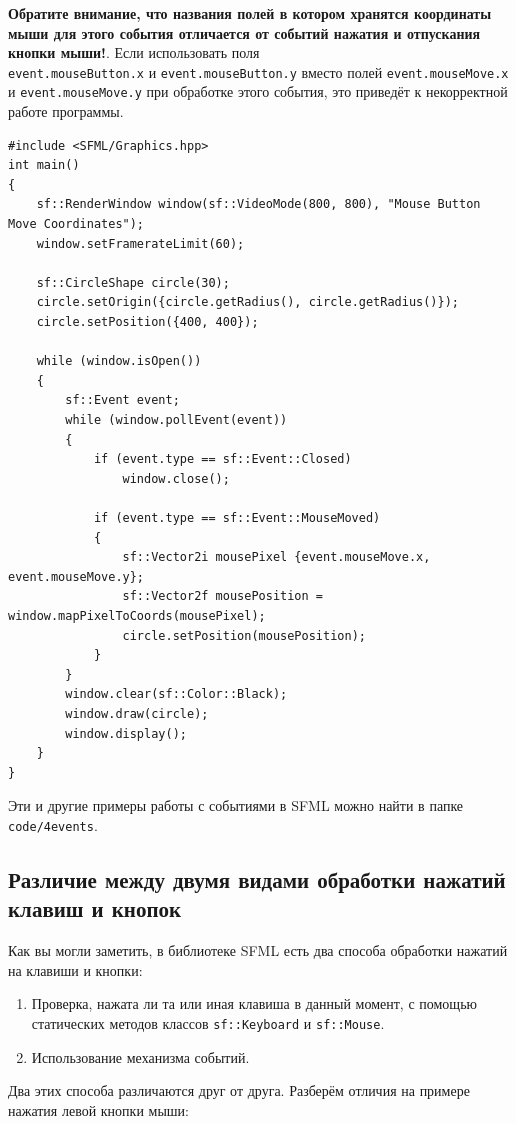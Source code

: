 \documentclass{article}
\begin{document}
\textbf{Обратите внимание, что названия полей в котором хранятся координаты мыши для этого события отличается от событий нажатия и отпускания кнопки мыши!}. Если использовать поля\\ \texttt{event.mouseButton.x} и \texttt{event.mouseButton.у} вместо полей \texttt{event.mouseMove.x} и \texttt{event.mouseMove.у} при обработке этого события, это приведёт к некорректной работе программы.
\begin{lstlisting}
#include <SFML/Graphics.hpp>
int main()
{
    sf::RenderWindow window(sf::VideoMode(800, 800), "Mouse Button Move Coordinates");
    window.setFramerateLimit(60);

    sf::CircleShape circle(30);
    circle.setOrigin({circle.getRadius(), circle.getRadius()});
    circle.setPosition({400, 400});

    while (window.isOpen()) 
    {
        sf::Event event;
        while (window.pollEvent(event)) 
        {
            if (event.type == sf::Event::Closed)
                window.close();

            if (event.type == sf::Event::MouseMoved)
            {
                sf::Vector2i mousePixel {event.mouseMove.x, event.mouseMove.y};
                sf::Vector2f mousePosition = window.mapPixelToCoords(mousePixel);
                circle.setPosition(mousePosition);
            }
        }
        window.clear(sf::Color::Black);
        window.draw(circle);
        window.display();
    }
}
\end{lstlisting}

Эти и другие примеры работы с событиями в SFML можно найти в папке \texttt{code/4events}.


\newpage
\subsection*{Различие между двумя видами обработки нажатий клавиш и кнопок}
Как вы могли заметить, в библиотеке SFML есть два способа обработки нажатий на клавиши и кнопки:
\begin{enumerate}
\item Проверка, нажата ли та или иная клавиша в данный момент, с помощью статических методов классов \texttt{sf::Keyboard} и \texttt{sf::Mouse}.
\item Использование механизма событий.
\end{enumerate}
Два этих способа различаются друг от друга. Разберём отличия на примере нажатия левой кнопки мыши:
\end{document}
